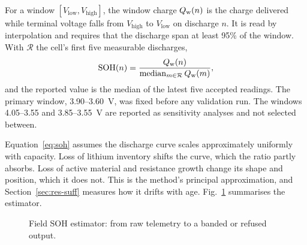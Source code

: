 For a window $[V_\mathrm{low}, V_\mathrm{high}]$, the window charge $Q_{\mathrm{w}}(n)$ is the charge delivered while terminal voltage falls from $V_\mathrm{high}$ to $V_\mathrm{low}$ on discharge $n$. It is read by interpolation and requires that the discharge span at least 95\% of the window. With $\mathcal{R}$ the cell's first five measurable discharges,
\begin{equation}
\mathrm{SOH}(n) = \frac{Q_{\mathrm{w}}(n)}{\operatorname{median}_{m\in\mathcal{R}} Q_{\mathrm{w}}(m)} ,
\label{eq:soh}
\end{equation}
and the reported value is the median of the latest five accepted readings. The primary window, 3.90--3.60~V, was fixed before any validation run. The windows 4.05--3.55 and 3.85--3.55~V are reported as sensitivity analyses and not selected between.

Equation~\eqref{eq:soh} assumes the discharge curve scales approximately uniformly with capacity. Loss of lithium inventory shifts the curve, which the ratio partly absorbs. Loss of active material and resistance growth change its shape and position, which it does not. This is the method's principal approximation, and Section~\ref{sec:res-suff} measures how it drifts with age. Fig.~\ref{fig:sohflow} summarises the estimator.

\begin{figure}[htbp]
    \centering
    \caption{Field SOH estimator: from raw telemetry to a banded or refused output.}
    \label{fig:sohflow}
\end{figure}

